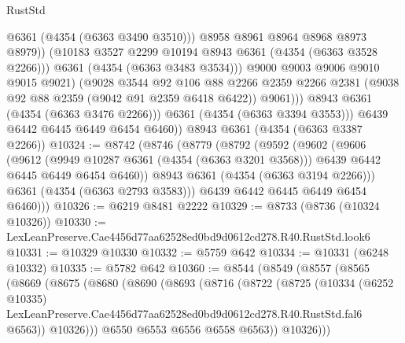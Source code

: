 \begin{lexlean}{RustStd}
\begin{coremodule}
                          @6361
                          (@4354 (@6363 @3490 @3510)))
                        @8958
                        @8961
                        @8964
                        @8968
                        @8973
                        @8979))
                    (@10183 @3527 @2299 @10194 @8943 @6361 (@4354 (@6363 @3528 @2266)))
                    @6361
                    (@4354 (@6363 @3483 @3534)))
                  @9000
                  @9003
                  @9006
                  @9010
                  @9015
                  @9021)
                (@9028
                  @3544
                  @92
                  @106
                  @88
                  @2266
                  @2359
                  @2266
                  @2381
                  (@9038 @92 @88 @2359 (@9042 @91 @2359 @6418 @6422))
                  @9061)))
            @8943
            @6361
            (@4354 (@6363 @3476 @2266)))
          @6361
          (@4354 (@6363 @3394 @3553)))
        @6439
        @6442
        @6445
        @6449
        @6454
        @6460))
    @8943
    @6361
    (@4354 (@6363 @3387 @2266))
@10324 := @8742
    (@8746
      (@8779
        (@8792
          (@9592
            (@9602
              (@9606
                (@9612
                  (@9949 @10287 @6361 (@4354 (@6363 @3201 @3568)))
                  @6439
                  @6442
                  @6445
                  @6449
                  @6454
                  @6460))
              @8943
              @6361
              (@4354 (@6363 @3194 @2266)))
            @6361
            (@4354 (@6363 @2793 @3583)))
          @6439
          @6442
          @6445
          @6449
          @6454
          @6460)))
@10326 := @6219 @8481 @2222
@10329 := @8733 (@8736 (@10324 @10326))
@10330 := LexLeanPreserve.Cae4456d77aa62528ed0bd9d0612cd278.R40.RustStd.look6
@10331 := @10329 @10330
@10332 := @5759 @642
@10334 := @10331 (@6248 @10332)
@10335 := @5782 @642
@10360 := @8544
    (@8549
      (@8557
        (@8565
          (@8669
            (@8675
              (@8680
                (@8690
                  (@8693
                    (@8716
                      (@8722
                        (@8725
                          (@10334
                            (@6252 @10335)
                            LexLeanPreserve.Cae4456d77aa62528ed0bd9d0612cd278.R40.RustStd.fal6
                            @6563))
                        @10326)))
                  @6550
                  @6553
                  @6556
                  @6558
                  @6563))
              @10326)))

\end{coremodule}
\end{lexlean}
